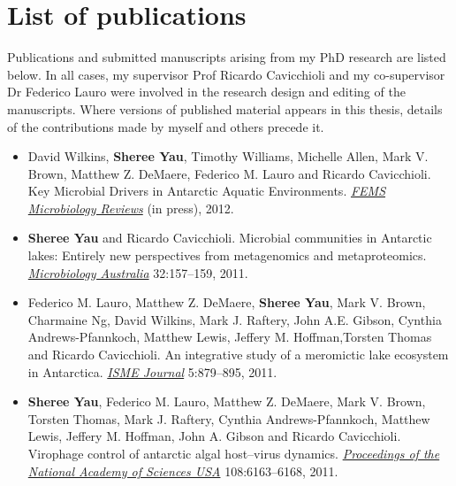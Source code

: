 \chapter*{List of publications}
Publications and submitted manuscripts arising from my PhD research are listed below.
In all cases, my supervisor Prof Ricardo Cavicchioli and my co-supervisor Dr Federico Lauro were
involved in the research design and editing of the manuscripts.
Where versions of published material appears in this thesis, details of the contributions made by myself and others precede it.

\begin{itemize}

\item David Wilkins, \textbf{Sheree Yau}, Timothy Williams, Michelle Allen, Mark V. Brown, Matthew Z. DeMaere, Federico M. Lauro and Ricardo Cavicchioli.
Key Microbial Drivers in Antarctic Aquatic Environments.
\emph{\underline{FEMS Microbiology Reviews}}
(in press), 2012.

\item \textbf{Sheree Yau} and Ricardo Cavicchioli. 
Microbial communities in Antarctic lakes: Entirely new perspectives from metagenomics and metaproteomics. 
\emph{\underline{Microbiology Australia}} 
32:157--159, 2011.

\item Federico M. Lauro, Matthew Z. DeMaere, \textbf{Sheree Yau}, Mark V. Brown, Charmaine Ng, David Wilkins, Mark J. Raftery, John A.E. Gibson, Cynthia Andrews-Pfannkoch, Matthew Lewis, Jeffery M. Hoffman,Torsten Thomas and Ricardo Cavicchioli. 
An integrative study of a meromictic lake ecosystem in Antarctica. 
\emph{\underline{ISME Journal}}
5:879--895, 2011.

\item \textbf{Sheree Yau}, Federico M. Lauro, Matthew Z. DeMaere, Mark V. Brown, Torsten Thomas, 
Mark J. Raftery, Cynthia Andrews-Pfannkoch, Matthew Lewis, Jeffery M. Hoffman, John A. Gibson and 
Ricardo Cavicchioli. 
Virophage control of antarctic algal host--virus dynamics. 
\emph{\underline{Proceedings of the National Academy of Sciences USA}}
108:6163--6168, 2011.

\end{itemize}

